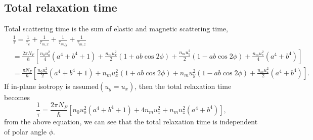 \documentclass[aps,prb,amsmath,amssymb,footinbib,showpacs,twocolumn]{revtex4-2}
\begin{document}
\begin{widetext}
\subsection{Total relaxation time}
Total scattering time is the sum of elastic and magnetic scattering time,
\begin{align}
    &\frac{1}{\tau}= \frac{1}{\tau_{e}}+ \frac{1}{\tau_{m,x}}+ \frac{1}{\tau_{m,y}}+ \frac{1}{\tau_{m,z}} \nonumber\\&
     = \frac{2\pi N_{F}}{\hbar}\left[ \frac{n_{0}u^{2}_{o}}{4}(a^{4}+b^{4}+1)+\frac{n_{m}u^{2}_{x}}{2}(1+ab\cos2\phi)+\frac{n_{m}u^{2}_{y}}{2}(1-ab\cos2\phi) + \frac{n_{m}u^{2}_{z}}{4}(a^{4}+b^{4})\right] \nonumber\\&
     = \frac{\pi N_{F}}{\hbar}\left[ \frac{n_{0}u^{2}_{o}}{2}(a^{4}+b^{4}+1)+ n_{m}u^{2}_{x}(1+ab\cos2\phi)+n_{m}u^{2}_{y}(1-ab\cos2\phi) + \frac{n_{m}u^{2}_{z}}{2}(a^{4}+b^{4})\right].
   \end{align}
If in-plane isotropy is assumed$(u_{y}=u_{x})$,  then the total relaxation time becomes
\begin{equation}
    \frac{1}{\tau}=  \frac{2\pi N_{F}}{\hbar}\left[n_{0}u^{2}_{o}(a^{4}+b^{4}+1)+4n_{m}u^{2}_{x}+ n_{m}u^{2}_{z}(a^{4}+b^{4})\right],
\end{equation}
  from  the above equation, we can see that the total relaxation time is independent of polar angle $\phi$.


\end{widetext}
\end{document}
